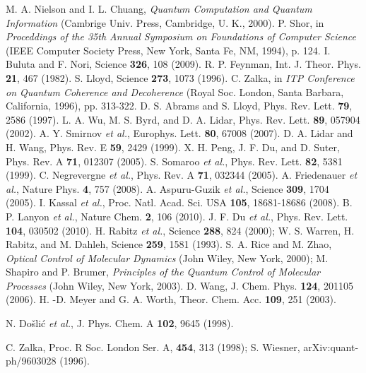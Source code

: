\documentclass[twocolumn,showpacs,twoside,10pt,prl]{revtex4}
\begin{document}
\begin{thebibliography}{99}
 M. A. Nielson and I. L. Chuang, {\it Quantum Computation and Quantum Information} (Cambrige Univ. Press, Cambridge, U. K., 2000).
 P. Shor, in {\it Proceddings of the 35th Annual Symposium on Foundations of Computer Science} (IEEE Computer Society Press, New York, Santa Fe, NM, 1994), p. 124.
 I. Buluta and F. Nori, Science \textbf{326}, 108 (2009).
 R. P. Feynman, Int. J. Theor. Phys. \textbf{21}, 467 (1982).
 S. Lloyd, Science \textbf{273}, 1073 (1996).
 C. Zalka, in {\it ITP Conference on Quantum Coherence and
Decoherence} (Royal Soc. London, Santa Barbara, California, 1996), pp. 313-322.
 D. S. Abrams and S. Lloyd, Phys. Rev. Lett. \textbf{79}, 2586
(1997).
 L. A. Wu, M. S. Byrd, and D. A. Lidar, Phys. Rev. Lett. \textbf{89},
057904 (2002).
 A. Y. Smirnov \emph{et al.},
Europhys. Lett. \textbf{80}, 67008 (2007).
 D. A. Lidar and H. Wang, Phys. Rev. E \textbf{59}, 2429 (1999).
 X. H. Peng, J. F. Du, and D. Suter, Phys. Rev. A \textbf{71},
012307 (2005).
 S. Somaroo \emph{et al.}, Phys. Rev. Lett. \textbf{82}, 5381 (1999).
 C. Negrevergne \emph{et al.}, Phys. Rev. A \textbf{71}, 032344 (2005).
 A. Friedenauer \emph{et al.}, Nature Phys. \textbf{4}, 757 (2008).
 A. Aspuru-Guzik \emph{et al.}, Science \textbf{309}, 1704 (2005).
 I. Kassal \emph{et al.}, Proc. Natl. Acad. Sci. USA \textbf{105}, 18681-18686 (2008).
 B. P. Lanyon \emph{et al.}, Nature Chem. \textbf{2}, 106 (2010).
 J. F. Du \emph{et al.}, Phys. Rev. Lett. \textbf{104}, 030502 (2010).
 H. Rabitz \emph{et al.}, Science \textbf{288}, 824 (2000);
W. S. Warren, H. Rabitz, and M. Dahleh, Science \textbf{ 259}, 1581 (1993).
 S. A. Rice and M. Zhao, {\it Optical Control of Molecular Dynamics}
(John Wiley, New York, 2000); M. Shapiro and P. Brumer, {\it Principles of the Quantum
Control of Molecular Processes} (John Wiley, New York, 2003).
 D. Wang, J. Chem. Phys. \textbf{124}, 201105 (2006).
 H. -D. Meyer and G. A. Worth,
Theor. Chem. Acc. \textbf{109}, 251 (2003).


N. {Do\v{s}li\'{c}} \emph{et al.}, J. Phys. Chem. A \textbf{102}, 9645 (1998).

 C. Zalka, Proc. R Soc. London Ser. A, \textbf{454}, 313 (1998); S. Wiesner, arXiv:quant-ph/9603028 (1996).


\end{thebibliography}
\end{document}
